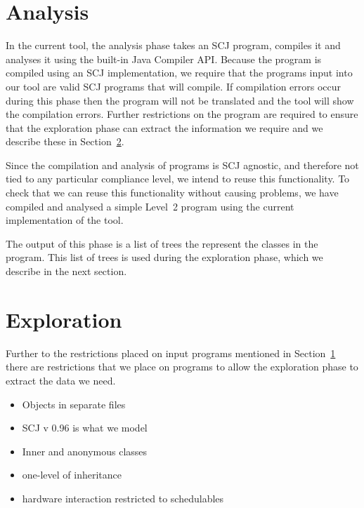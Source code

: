 \documentclass[10pt,a4paper]{article}
\begin{document}
\section{Analysis}
\label{sec:analysis}

In the current tool, the analysis phase takes an SCJ program, compiles it and analyses it using the built-in Java Compiler API. Because the program is compiled using an SCJ implementation, we require that the programs input into our tool are valid SCJ programs that will compile. If compilation errors occur during this phase then the program will not be translated and the tool will show the compilation errors. Further restrictions on the program are required to ensure that the exploration phase can extract the information we require and we describe these in Section~\ref{sec:exploration}.

Since the compilation and analysis of programs is SCJ agnostic, and therefore not tied to any particular compliance level, we intend to reuse this functionality. To check that we can reuse this functionality without causing problems, we have compiled and analysed a simple Level~2 program using the current implementation of the tool. 

The output of this phase is a list of trees the represent the classes in the program. This list of trees is used during the exploration phase, which we describe in the next section.

\section{Exploration}
\label{sec:exploration}

Further to the restrictions placed on input programs mentioned in Section~\ref{sec:analysis} there are restrictions that we place on programs to allow the exploration phase to extract the data we need.


\begin{itemize}
\item Objects in separate files
\item SCJ v 0.96 is what we model
\end{itemize}

\begin{itemize}
\item Inner and anonymous classes
\item one-level of inheritance
\item hardware interaction restricted to schedulables %
\end{itemize}
\end{document}
